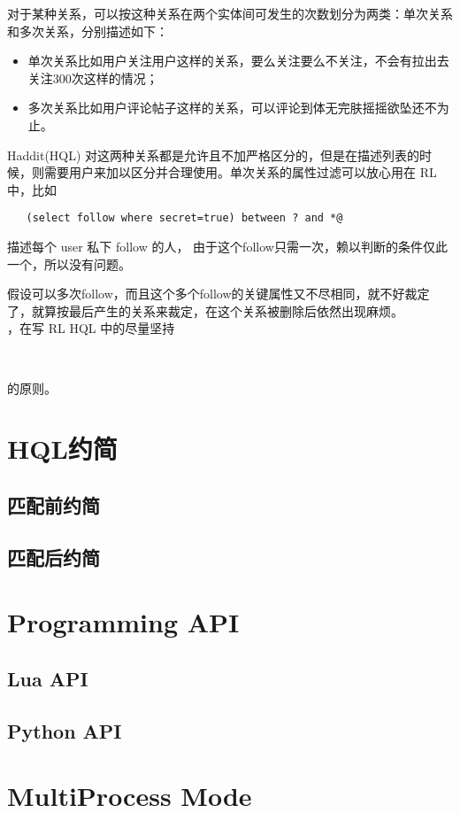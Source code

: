 \documentclass[10pt,a4paper]{article}
\begin{document}
\begin{CJK}{UTF8}{gbsn}
  对于某种关系，可以按这种关系在两个实体间可发生的次数划分为两类：单次关系和多次关系，分别描述如下：
  \begin{itemize}
  \item 单次关系比如用户关注用户这样的关系，要么关注要么不关注，不会有拉出去关注300次这样的情况；
  \item 多次关系比如用户评论帖子这样的关系，可以评论到体无完肤摇摇欲坠还不为止。
  \end{itemize}

  Haddit(HQL) 对这两种关系都是允许且不加严格区分的，但是在描述列表的时候，则需要用户来加以区分并合理使用。单次关系的属性过滤可以放心用在 RL 中，比如
\begin{verbatim}
   (select follow where secret=true) between ? and *@
\end{verbatim}
  描述每个 user 私下 follow 的人， 由于这个follow只需一次，赖以判断的条件仅此一个，所以没有问题。

  假设可以多次follow，而且这个多个follow的关键属性又不尽相同，就不好裁定了，就算按最后产生的关系来裁定，在这个关系被删除后依然出现麻烦。\\

  ，在写 RL HQL 中的尽量坚持 \\
  \begin{center}
    \\
  \end{center}
  的原则。

  \section{HQL约简}
  \subsection{匹配前约简}
  \subsection{匹配后约简}

  \section{Programming API}
  \subsection{Lua API}
  \subsection{Python API}
  \section{MultiProcess Mode}

\newpage
\end{CJK}
\end{document}
